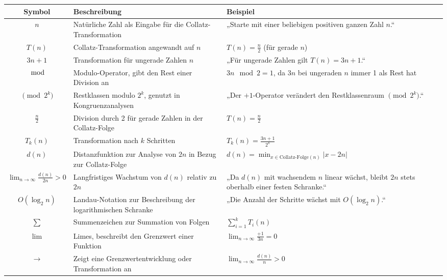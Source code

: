 \documentclass[a4paper,12pt]{article}
\begin{document}
\begin{table}[h!]
    \centering
    \begin{tabular}{|c|p{7cm}|p{5cm}|}
    \hline
    \textbf{Symbol} & \textbf{Beschreibung} & \textbf{Beispiel} \\ \hline
    \( n \) & Natürliche Zahl als Eingabe für die Collatz-Transformation & „Starte mit einer beliebigen positiven ganzen Zahl \( n \).“ \\ \hline
    \( T(n) \) & Collatz-Transformation angewandt auf \( n \) & \( T(n) = \frac{n}{2} \) (für gerade \( n \)) \\ \hline
    \( 3n + 1 \) & Transformation für ungerade Zahlen \( n \) & „Für ungerade Zahlen gilt \( T(n) = 3n + 1 \).“ \\ \hline
    \( \mod \) & Modulo-Operator, gibt den Rest einer Division an & \( 3n \mod 2 = 1 \), da \( 3n \) bei ungeraden \( n \) immer 1 als Rest hat \\ \hline
    \( \pmod{2^k} \) & Restklassen modulo \( 2^k \), genutzt in Kongruenzanalysen & „Der \(+1\)-Operator verändert den Restklassenraum \( \pmod{2^k} \).“ \\ \hline
    \( \frac{n}{2} \) & Division durch 2 für gerade Zahlen in der Collatz-Folge & \( T(n) = \frac{n}{2} \) \\ \hline
    \( T_k(n) \) & Transformation nach \( k \) Schritten & \( T_k(n) = \frac{3n + 1}{2^k} \) \\ \hline
    \( d(n) \) & Distanzfunktion zur Analyse von \( 2n \) in Bezug zur Collatz-Folge & \( d(n) = \min_{x \in \text{Collatz-Folge}(n)} |x - 2n| \) \\ \hline
    \( \lim_{n \to \infty} \frac{d(n)}{2n} > 0 \) & Langfristiges Wachstum von \( d(n) \) relativ zu \( 2n \) & „Da \( d(n) \) mit wachsendem \( n \) linear wächst, bleibt \( 2n \) stets oberhalb einer festen Schranke.“ \\ \hline
    \( O(\log_2 n) \) & Landau-Notation zur Beschreibung der logarithmischen Schranke & „Die Anzahl der Schritte wächst mit \( O(\log_2 n) \).“ \\ \hline
    \( \sum \) & Summenzeichen zur Summation von Folgen & \( \sum_{i=1}^k T_i(n) \) \\ \hline
    \( \lim \) & Limes, beschreibt den Grenzwert einer Funktion & \( \lim_{n \to \infty} \frac{+1}{3n} = 0 \) \\ \hline
    \( \to \) & Zeigt eine Grenzwertentwicklung oder Transformation an & \( \lim_{n \to \infty} \frac{d(n)}{n} > 0 \) \\ \hline

\end{tabular}
\end{table}
\end{document}

